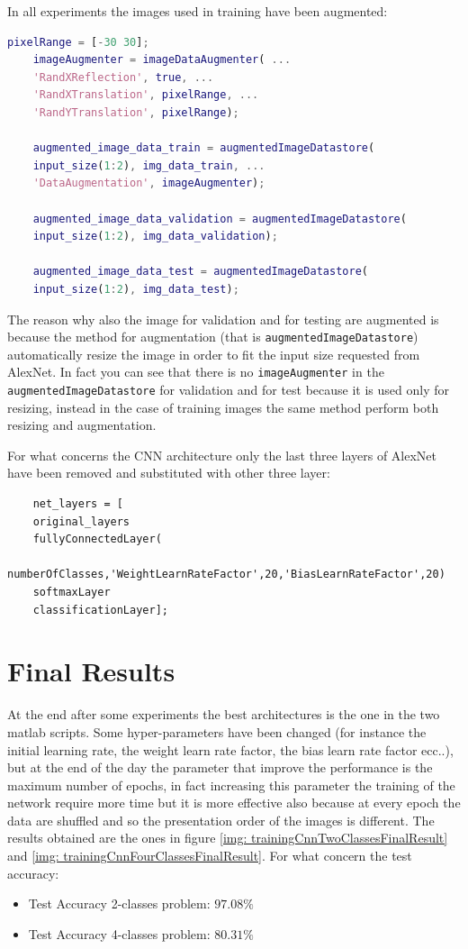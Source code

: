 \documentclass[a4paper]{report}
\begin{document}
	\noindent In all experiments the images used in training have been augmented:
	\begin{lstlisting}[language=Matlab]
	pixelRange = [-30 30];
	imageAugmenter = imageDataAugmenter( ...
	'RandXReflection', true, ...
	'RandXTranslation', pixelRange, ...
	'RandYTranslation', pixelRange);
	
	augmented_image_data_train = augmentedImageDatastore(
	input_size(1:2), img_data_train, ...
	'DataAugmentation', imageAugmenter);
	
	augmented_image_data_validation = augmentedImageDatastore(
	input_size(1:2), img_data_validation);
	
	augmented_image_data_test = augmentedImageDatastore(
	input_size(1:2), img_data_test);
	\end{lstlisting}

	\noindent The reason why also the image for validation and for testing are augmented is because the method for augmentation (that is \texttt{augmentedImageDatastore}) automatically resize the image in order to fit the input size requested from AlexNet. In fact you can see that there is no \texttt{imageAugmenter} in the \texttt{augmentedImageDatastore} for validation and for test because it is used only for resizing, instead in the case of training images the same method perform both resizing and augmentation.
	
	\noindent For what concerns the CNN architecture only the last three layers of AlexNet have been removed and substituted with other three layer:
	
	\begin{lstlisting}
	net_layers = [
	original_layers
	fullyConnectedLayer(
		numberOfClasses,'WeightLearnRateFactor',20,'BiasLearnRateFactor',20)
	softmaxLayer
	classificationLayer]; 
	\end{lstlisting}

	\section{Final Results}
	\noindent At the end after some experiments the best architectures is the one in the two matlab scripts. Some hyper-parameters have been changed (for instance the initial learning rate, the weight learn rate factor, the bias learn rate factor ecc..), but at the end of the day the parameter that improve the performance is the maximum number of epochs, in fact increasing this parameter the training of the network require more time but it is more effective also because at every epoch the data are shuffled and so the presentation order of the images is different. The results obtained are the ones in figure \ref{img: trainingCnnTwoClassesFinalResult} and \ref{img: trainingCnnFourClassesFinalResult}. For what concern the test accuracy:
	\begin{itemize}
	\item Test Accuracy 2-classes problem: $97.08\%$
	\item Test Accuracy 4-classes problem: $80.31\%$
	\end{itemize}
	
\end{document}

